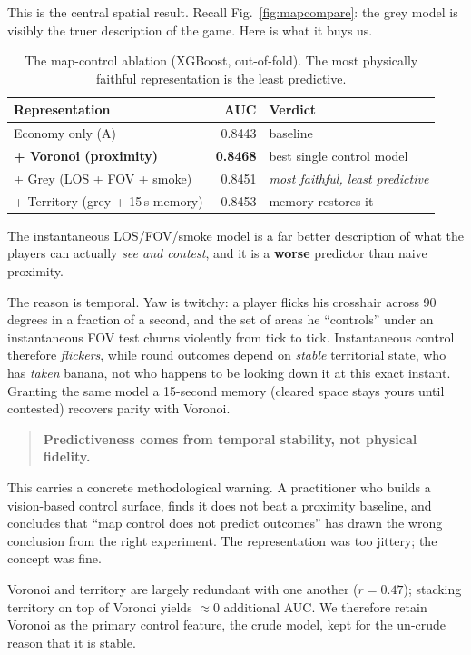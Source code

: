 \documentclass[11pt,a4paper]{article}
\begin{document}
This is the central spatial result. Recall Fig.~\ref{fig:mapcompare}: the grey model is
visibly the truer description of the game. Here is what it buys us.

\begin{table}[H]
\centering
\caption{The map-control ablation (XGBoost, out-of-fold). The most physically faithful
representation is the least predictive.}
\label{tab:mapcontrol}
\begin{tabular}{lrl}
\toprule
Representation & AUC & Verdict \\
\midrule
Economy only (A)                  & 0.8443 & baseline \\
\textbf{+ Voronoi (proximity)}    & \textbf{0.8468} & best single control model \\
+ Grey (LOS + FOV + smoke)        & 0.8451 & \emph{most faithful, least predictive} \\
+ Territory (grey + 15\,s memory) & 0.8453 & memory restores it \\
\bottomrule
\end{tabular}
\end{table}

The instantaneous LOS/FOV/smoke model is a far better description of what the players can
actually \emph{see and contest}, and it is a \textbf{worse} predictor than naive
proximity.

The reason is temporal. Yaw is twitchy: a player flicks his crosshair across 90 degrees in
a fraction of a second, and the set of areas he ``controls'' under an instantaneous FOV test
churns violently from tick to tick. Instantaneous control therefore \emph{flickers}, while
round outcomes depend on \emph{stable} territorial state, who has \emph{taken} banana, not
who happens to be looking down it at this exact instant. Granting the same model a 15-second
memory (cleared space stays yours until contested) recovers parity with Voronoi.

\begin{quote}
\textbf{Predictiveness comes from temporal stability, not physical fidelity.}
\end{quote}

This carries a concrete methodological warning. A practitioner who builds a vision-based
control surface, finds it does not beat a proximity baseline, and concludes that ``map
control does not predict outcomes'' has drawn the wrong conclusion from the right
experiment. The representation was too jittery; the concept was fine.

Voronoi and territory are largely redundant with one another ($r = 0.47$); stacking
territory on top of Voronoi yields $\approx 0$ additional AUC. We therefore retain Voronoi
as the primary control feature, the crude model, kept for the un-crude reason that it is
stable.
\end{document}
